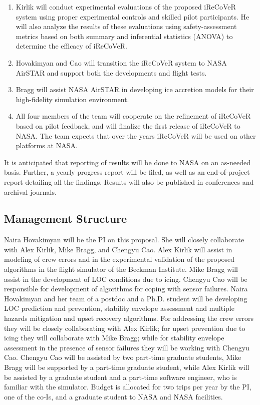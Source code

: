 \documentclass[letter,onecolumn,12pt]{aiaa-tc}
\let\origdescription\description
\renewenvironment{description}{
  \setlength{\leftmargini}{0mm}
  \origdescription
}
{\endlist}
\begin{document}
\begin{description}
\begin{enumerate}
            \item Kirlik will conduct experimental evaluations of the proposed iReCoVeR system using proper experimental controls and skilled pilot participants. He will also analyze the results of these evaluations using safety-assessment metrics based on both summary and inferential statistics (ANOVA) to determine the efficacy of iReCoVeR.

            \item Hovakimyan and Cao will transition the iReCoVeR system to NASA AirSTAR and support both the developments and flight tests.

            \item Bragg will assist NASA AirSTAR in developing ice accretion models for their high-fidelity simulation environment.

            \item All four members of the team will cooperate on the refinement of iReCoVeR based on pilot feedback, and will finalize the first release of iReCoVeR to NASA. The team expects that over the years iReCoVeR will be used on other platforms at NASA.

        \end{enumerate}

    \item[Reporting:] It is anticipated that reporting of results will be done to NASA on an as-needed basis. Further, a yearly progress report will be filed, as well as an end-of-project report detailing all the findings. Results will also be published in conferences and archival journals.

\end{description}


\subsection{Management Structure}
Naira Hovakimyan will be the PI on this proposal. She will closely collaborate with Alex Kirlik, Mike Bragg, and Chengyu Cao. Alex Kirlik will assist in modeling of crew errors and in the experimental validation of the proposed algorithms in the flight simulator of the Beckman Institute. Mike Bragg will assist in the development of LOC conditions due to icing. Chengyu Cao will be responsible for development of algorithms for coping with sensor failures. Naira Hovakimyan and her team of a postdoc and a Ph.D. student will be developing LOC prediction and prevention, stability envelope assessment and multiple hazards mitigation and upset recovery algorithms. For addressing the crew errors they will be closely collaborating with  Alex Kirlik; for upset prevention due to icing they will collaborate with Mike Bragg; while for stability envelope assessment in the presence of sensor failures they will be working with Chengyu Cao. Chengyu Cao will be assisted by two part-time graduate students, Mike Bragg will be supported by a part-time graduate student, while Alex Kirlik will be assisted by a graduate student and a part-time software engineer, who is familiar with the simulator. Budget is allocated for two trips per year by the PI, one of the co-Is, and a graduate student to NASA and NASA facilities.
\end{document}
